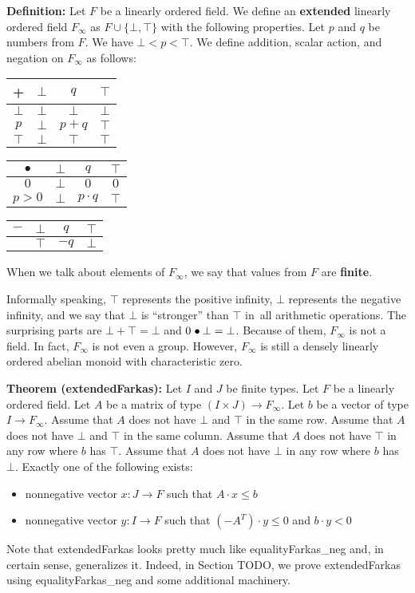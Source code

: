 \documentclass[]{article}
\renewcommand{\.}{\hskip .75pt}
\let\r=\rightarrow
\let\*=\cdot
\begin{document}
\medskip \noindent
\textbf{Definition:}
Let $F$ be a linearly ordered field.
We define an \textbf{extended} linearly ordered field $F_\infty$ as
$F \cup \{ \bot, \top \}$ with the following properties.
Let $p$ and $q$ be numbers from $F$.
We have $\bot < p < \top$.
We define addition, scalar action, and negation on $F_\infty$ as follows:
\begin{center}
	\begin{tabular}{ c || c | c | c | }
		+ & $\bot$ & $q$ & $\top$  \\
		\hline\hline
		$\bot$ & $\bot$ & $\bot$ & $\bot$  \\ 
		\hline
		$p$ & $\bot$ & $p\!+\!q$ & $\top$  \\ 
		\hline
		$\top$ & $\bot$ & $\top$ & $\top$ \\ 
		\hline
	\end{tabular}
	\qquad\qquad\qquad
	\begin{tabular}{ c || c | c | c | }
		$\bullet$ & $\bot$ & $q$ & $\top$  \\
		\hline\hline
		$0$ & $\bot$ & $0$ & $0$  \\ 
		\hline
		$p>0$ & $\bot$ & $p \cdot q$ & $\top$  \\ 
		\hline
	\end{tabular}
	\qquad\qquad\qquad
	\begin{tabular}{ c || c | c | c }
	$-$ & $\bot$ & $q$ & $\top$  \\
	\hline\hline
	& $\top$ & $-q$ & $\bot$  
	\end{tabular}
\end{center}
When we talk about elements of $F_\infty$,
we say that values from $F$ are \textbf{finite}.

Informally speaking, $\top$ represents the positive infinity,
$\bot$ represents the negative infinity, and we say that
$\bot$ is ``stronger'' than $\top$ in~all arithmetic operations.
The surprising parts are $\bot + \top = \bot$ and $0 \.\bullet \bot = \bot$.
Because of them, $F_\infty$ is not a field.
In fact, $F_\infty$ is not even a group. 
However, $F_\infty$ is still a densely linearly ordered abelian monoid
with characteristic zero.

\medskip \noindent
\textbf{Theorem (extendedFarkas):}
Let $I$ and $J$ be finite types.
Let $F$ be a linearly ordered field.
Let $A$ be a matrix of type $(I \times J) \r F_\infty$.
Let $b$ be a vector of type $I \r F_\infty$.
Assume that $A$ does not have $\bot$ and $\top$ in the same row.
Assume that $A$ does not have $\bot$ and $\top$ in the same column.
Assume that $A$ does not have $\top$ in any row where $b$ has $\top$.
Assume that $A$ does not have $\bot$ in any row where $b$ has~$\bot$.
Exactly one of the following exists:
\begin{itemize}
\item nonnegative vector $x : J \r F$ such that $A \* x \le b$
\item nonnegative vector $y : I \r F$ such that $(-A^T) \* y \le 0$ and $b \* y < 0$
\end{itemize}
Note that extendedFarkas looks pretty much like equalityFarkas\_neg and,
in certain sense, generalizes it. Indeed, in Section TODO, we prove
extendedFarkas using equalityFarkas\_neg and some additional machinery.
\end{document}
